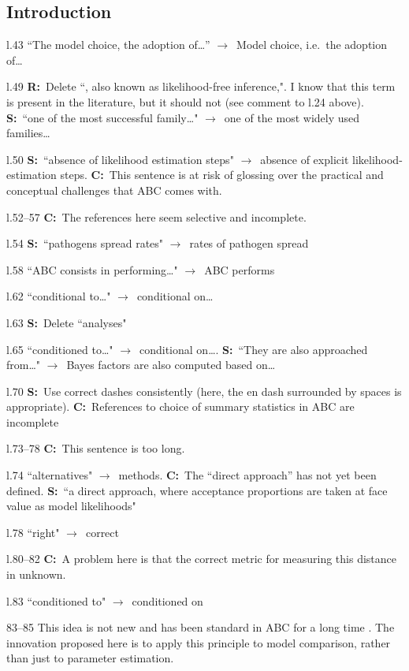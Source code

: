 \documentclass[11pt]{article}
\newenvironment{my_description}
{\begin{description}
  \setlength{\itemsep}{2pt}
  \setlength{\parskip}{0pt}
  \setlength{\parsep}{0pt}}
{\end{description}}
\newcommand{\ra}{$\rightarrow$\ }
\newcommand{\C}{\textbf{C:}\ }
\newcommand{\R}{\textbf{R:}\ }
\newcommand{\V}{\textbf{S:}\ }
\begin{document}
\subsection{Introduction}
\begin{my_description}
	\item[l.43] ``The model choice, the adoption of\dots'' \ra Model choice, i.e.\ the adoption of\dots
	\item[l.49] \R Delete ``, also known as likelihood-free inference,". I know that this term is present in the literature, but it should not (see comment to l.24 above). \V ``one of the most successful family\dots" \ra one of the most widely used families\dots
	\item[l.50] \V ``absence of likelihood estimation steps" \ra absence of explicit likelihood-estimation steps. \C This sentence is at risk of glossing over the practical and conceptual challenges that ABC comes with.
	\item[l.52--57]  \C The references here seem selective and incomplete.
	\item[l.54] \V ``pathogens spread rates" \ra rates of pathogen spread
	\item[l.58] ``ABC consists in performing\dots" \ra ABC performs
	\item[l.62] ``conditional to\dots" \ra conditional on\dots
	\item[l.63] \V Delete ``analyses"
	\item[l.65] ``conditioned to\dots" \ra conditional on\dots. \V ``They are also approached from\dots" \ra Bayes factors are also computed based on\dots
	\item[l.70] \V Use correct dashes consistently (here, the en dash surrounded by spaces is appropriate). \C References to choice of summary statistics in ABC are incomplete \cite[e.g.][]{Wegmann:2009sf,Nunes:2010fk,Fearnhead:2011uq,Aeschbacher:2011fk,Blum:2012fk}
	\item[l.73--78] \C This sentence is too long.
	\item[l.74] ``alternatives" \ra methods. \C The ``direct approach'' has not yet been defined. \V ``a direct approach, where acceptance proportions are taken at face value as model likelihoods"
	\item[l.78] ``right" \ra correct
	\item[l.80--82] \C A problem here is that the correct metric for measuring this distance in unknown.
	\item[l.83] ``conditioned to" \ra conditioned on
	\item[83--85] This idea is not new and has been standard in ABC for a long time \cite[][]{Beaumont:2002bh}. The innovation proposed here is to apply this principle to model comparison, rather than just to parameter estimation.

\end{my_description}
\end{document}

